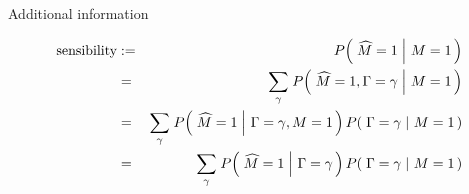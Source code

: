 
\newcommand{\pot}{{\color{red}p^{(1)}_{2}}}

\newcommand{\ptz}{{\color{blue}p^{(2)}_{0}}}
\newcommand{\pto}{{\color{blue}p^{(2)}_{1}}}

\newcommand{\phz}{{\color{green}p^{(3)}_{0}}}
\newcommand{\pho}{{\color{green}p^{(3)}_{1}}}

\newcommand{\pozz}{{\color{red}p^{(1)}_{0|0}}}
\newcommand{\pooz}{{\color{red}p^{(1)}_{1|0}}}

\newcommand{\ptzz}{{\color{blue}p^{(2)}_{0|0}}}
\newcommand{\ptoz}{{\color{blue}p^{(2)}_{1|0}}}

\newcommand{\phzz}{{\color{green}p^{(3)}_{0|0}}}
\newcommand{\phoz}{{\color{green}p^{(3)}_{1|0}}}

\newcommand{\pozo}{{\color{pink}p^{(1)}_{0|1}}}
\newcommand{\pooo}{{\color{pink}p^{(1)}_{1|1}}}

\newcommand{\ptzo}{{\color{cyan}p^{(2)}_{0|1}}}
\newcommand{\ptoo}{{\color{cyan}p^{(2)}_{1|1}}}

\newcommand{\phzo}{{\color{lime}p^{(3)}_{0|1}}}
\newcommand{\phoo}{{\color{lime}p^{(3)}_{1|1}}}

\newcommand{\pzz}{{\color{pink}p_{0\vert0}}}
\newcommand{\poz}{{\color{pink}p_{1\vert0}}}
\newcommand{\qzz}{{\color{cyan}q_{0\vert0}}}
\newcommand{\qoz}{{\color{cyan}q_{1\vert0}}}
\newcommand{\rzz}{{\color{green}r_{0\vert0}}}
\newcommand{\roz}{{\color{green}r_{1\vert0}}}

\newcommand{\pzo}{{\color{red}p_{0\vert1}}}
\newcommand{\poo}{{\color{red}p_{1\vert 1}}}
\newcommand{\qzo}{{\color{blue}q_{0\vert1}}}
\newcommand{\qoo}{{\color{blue}q_{1\vert1}}}
\newcommand{\rzo}{{\color{deepGreen}r_{0\vert1}}}
\newcommand{\roo}{{\color{deepGreen}r_{1\vert1}}}

\begin{frame}{\vskip -0.2cm \LARGE Additional information}

\begin{eqnarray*}
\textnormal{sensibility}
&:=&
	P\!\left(\,\left.\widehat{M}=1\;\right\vert\,M=1\,\right)
\\
&=&
	\underset{\gamma}{\sum}\;P\!\left(\,\left.\widehat{M}=1,\Gamma=\gamma\;\right\vert\,M=1\,\right)
\\
&=&
	\underset{\gamma}{\sum}\;
	P\!\left(\,\left.\widehat{M}=1\;\right\vert\,\Gamma=\gamma,M=1\,\right)
	P\!\left(\,\left.\Gamma=\gamma\;\right\vert\,M=1\,\right)
\\
&=&
	\underset{\gamma}{\sum}\;
	P\!\left(\,\left.\widehat{M}=1\;\right\vert\,\Gamma=\gamma\,\right)
	P\!\left(\,\left.\Gamma=\gamma\;\right\vert\,M=1\,\right)
\\
\end{eqnarray*}

\end{frame}
\normalsize

